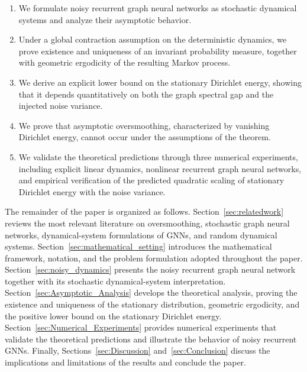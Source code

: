 \documentclass{article}
\begin{document}
\begin{enumerate}
	
	\item
	We formulate noisy recurrent graph neural networks as stochastic
	dynamical systems and analyze their asymptotic behavior.
	
	\item
	Under a global contraction assumption on the deterministic dynamics, we
	prove existence and uniqueness of an invariant probability measure,
	together with geometric ergodicity of the resulting Markov process.
	
	\item
	We derive an explicit lower bound on the stationary Dirichlet energy,
	showing that it depends quantitatively on both the graph spectral gap
	and the injected noise variance.
	
	\item
	We prove that asymptotic oversmoothing, characterized by vanishing
	Dirichlet energy, cannot occur under the assumptions of the theorem.
	
	\item
	We validate the theoretical predictions through three numerical
	experiments, including explicit linear dynamics, nonlinear recurrent
	graph neural networks, and empirical verification of the predicted
	quadratic scaling of stationary Dirichlet energy with the noise
	variance.
	
\end{enumerate}

The remainder of the paper is organized as follows.
Section~\ref{sec:relatedwork} reviews the most relevant literature on oversmoothing,
stochastic graph neural networks, dynamical-system formulations of GNNs,
and random dynamical systems.
Section~\ref{sec:mathematical_setting} introduces the mathematical framework, notation, and the
problem formulation adopted throughout the paper.
Section~\ref{sec:noisy_dynamics} presents the noisy recurrent graph neural network together with
its stochastic dynamical-system interpretation.
Section~\ref{sec:Asymptotic_Analysis} develops the theoretical analysis, proving the existence and
uniqueness of the stationary distribution, geometric ergodicity, and the
positive lower bound on the stationary Dirichlet energy.
Section~\ref{sec:Numerical_Experiments} provides numerical experiments that validate the theoretical
predictions and illustrate the behavior of noisy recurrent GNNs.
Finally, Sections~\ref{sec:Discussion} and~\ref{sec:Conclusion} discuss the implications and limitations of the
results and conclude the paper.
\end{document}
